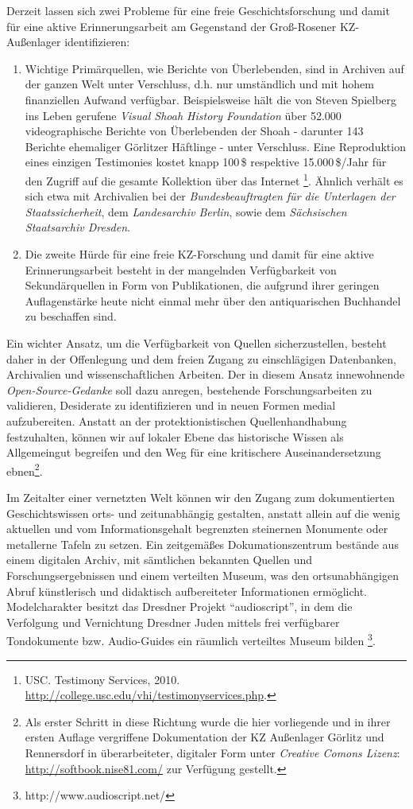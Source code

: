 Derzeit lassen sich zwei Probleme für eine freie Geschichtsforschung
und damit für eine aktive Erinnerungsarbeit am Gegenstand der Groß-Rosener
KZ-Außenlager identifizieren: 
\begin{enumerate}
\item Wichtige Primärquellen, wie Berichte von Überlebenden, sind in Archiven
auf der ganzen Welt unter Verschluss, d.h. nur umständlich und mit
hohem finanziellen Aufwand verfügbar. Beispielsweise hält die von
Steven Spielberg ins Leben gerufene \emph{Visual Shoah History Foundation}
über 52.000 videographische Berichte von Überlebenden der Shoah -
da\-runter 143 Berichte ehemaliger Görlitzer Häftlinge - unter Verschluss.
Eine Reproduktion eines einzigen Testimonies kostet knapp 100\,\$ respektive
15.000\,\$/Jahr für den Zugriff auf die gesamte Kollektion über das
Internet \footnote{USC. Testimony Services, 2010. \url{http://college.usc.edu/vhi/testimonyservices.php}.}. Ähnlich verhält es sich etwa mit Archivalien
bei der \emph{Bundesbeauftragten für die Unterlagen der Staatssicherheit},
dem \emph{Landesarchiv Berlin}, sowie dem \emph{Sächsischen Staatsarchiv
Dresden}.
\item Die zweite Hürde für eine freie KZ-Forschung und damit für eine aktive
Erinnerungsarbeit besteht in der mangelnden Verfügbarkeit von Sekundärquellen
in Form von Publikationen, die aufgrund ihrer geringen Auflagenstärke
heute nicht einmal mehr über den antiquarischen Buchhandel zu beschaffen
sind. 
\end{enumerate}
Ein wichter Ansatz, um die Verfügbarkeit von Quellen sicherzustellen,
besteht daher in der Offenlegung und dem freien Zugang zu einschlägigen
Datenbanken, Archivalien und wissenschaftlichen Arbeiten. Der in diesem
Ansatz innewohnende \emph{Open-Source-Gedanke} soll dazu anregen,
bestehende Forschungsarbeiten zu validieren, Desiderate zu identifizieren
und in neuen Formen medial aufzubereiten. Anstatt an der protektionistischen
Quellenhandhabung festzuhalten, können wir auf lokaler Ebene das historische
Wissen als Allgemeingut begreifen und den Weg für eine kritischere
Auseinandersetzung ebnen\footnote{Als erster Schritt in diese Richtung wurde die hier vorliegende und in ihrer ersten Auflage vergriffene Dokumentation der KZ Außenlager Görlitz und Rennersdorf in überarbeiteter, digitaler Form unter \emph{Creative Comons Lizenz}: \url{http://softbook.nise81.com/} zur Verfügung gestellt.}. 

Im Zeitalter einer vernetzten Welt können wir den Zugang zum dokumentierten
Geschichts\-wissen orts- und zeitunabhängig gestalten, anstatt allein
auf die wenig aktuellen und vom Informationsgehalt begrenzten steinernen
Monumente oder metallerne Tafeln zu setzen. Ein zeitgemäßes Dokumationszentrum
bestände aus einem digitalen Archiv, mit sämtlichen bekannten Quellen
und Forschungsergebnissen und einem verteilten Museum, was den ortsunabhängigen
Abruf künstlerisch und didaktisch aufbereiteter Informationen ermöglicht.
Modelcharakter besitzt das Dresdner Projekt {}``audioscript'',
in dem die Verfolgung und Vernichtung Dresdner Juden mittels frei
verfügbarer Tondokumente bzw. Audio-Guides ein räumlich verteiltes
Museum bilden%
\footnote{http://www.audioscript.net/%
}. 





